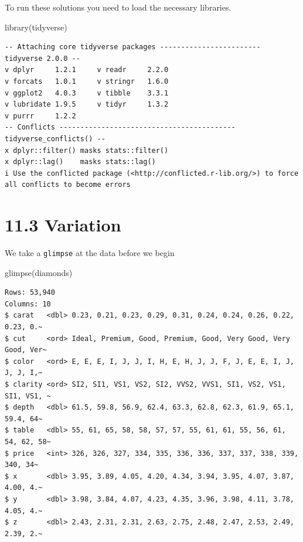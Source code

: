 \documentclass[
  letterpaper,
  DIV=11,
  numbers=noendperiod]{scrreprt}
\newenvironment{Shaded}{\begin{snugshade}}{\end{snugshade}}
\newcommand{\FunctionTok}[1]{\textcolor[rgb]{0.28,0.35,0.67}{#1}}
\newcommand{\NormalTok}[1]{\textcolor[rgb]{0.00,0.23,0.31}{#1}}
\begin{document}
To run these solutions you need to load the necessary libraries.

\begin{Shaded}
\begin{Highlighting}[]
\FunctionTok{library}\NormalTok{(tidyverse)}
\end{Highlighting}
\end{Shaded}

\begin{verbatim}
-- Attaching core tidyverse packages ------------------------ tidyverse 2.0.0 --
v dplyr     1.2.1     v readr     2.2.0
v forcats   1.0.1     v stringr   1.6.0
v ggplot2   4.0.3     v tibble    3.3.1
v lubridate 1.9.5     v tidyr     1.3.2
v purrr     1.2.2     
-- Conflicts ------------------------------------------ tidyverse_conflicts() --
x dplyr::filter() masks stats::filter()
x dplyr::lag()    masks stats::lag()
i Use the conflicted package (<http://conflicted.r-lib.org/>) to force all conflicts to become errors
\end{verbatim}

\section{11.3 Variation}\label{variation}

We take a \texttt{glimpse} at the data before we begin

\begin{Shaded}
\begin{Highlighting}[]
\FunctionTok{glimpse}\NormalTok{(diamonds)}
\end{Highlighting}
\end{Shaded}

\begin{verbatim}
Rows: 53,940
Columns: 10
$ carat   <dbl> 0.23, 0.21, 0.23, 0.29, 0.31, 0.24, 0.24, 0.26, 0.22, 0.23, 0.~
$ cut     <ord> Ideal, Premium, Good, Premium, Good, Very Good, Very Good, Ver~
$ color   <ord> E, E, E, I, J, J, I, H, E, H, J, J, F, J, E, E, I, J, J, J, I,~
$ clarity <ord> SI2, SI1, VS1, VS2, SI2, VVS2, VVS1, SI1, VS2, VS1, SI1, VS1, ~
$ depth   <dbl> 61.5, 59.8, 56.9, 62.4, 63.3, 62.8, 62.3, 61.9, 65.1, 59.4, 64~
$ table   <dbl> 55, 61, 65, 58, 58, 57, 57, 55, 61, 61, 55, 56, 61, 54, 62, 58~
$ price   <int> 326, 326, 327, 334, 335, 336, 336, 337, 337, 338, 339, 340, 34~
$ x       <dbl> 3.95, 3.89, 4.05, 4.20, 4.34, 3.94, 3.95, 4.07, 3.87, 4.00, 4.~
$ y       <dbl> 3.98, 3.84, 4.07, 4.23, 4.35, 3.96, 3.98, 4.11, 3.78, 4.05, 4.~
$ z       <dbl> 2.43, 2.31, 2.31, 2.63, 2.75, 2.48, 2.47, 2.53, 2.49, 2.39, 2.~
\end{verbatim}
\end{document}
